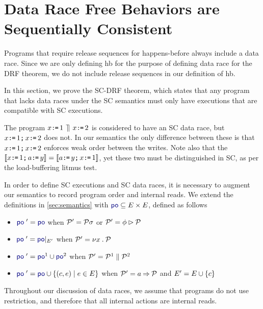 \section{Data Race Free Behaviors are Sequentially Consistent}
\label{sec:sc}


Programs that require release sequences for happens-before always include a
data race.  Since we are only defining hb for the purpose of defining data
race for the DRF theorem, we do not include release sequences in our
definition of hb.

In this section, we prove the SC-DRF theorem, which states that any program
that lacks data races under the SC semantics must only have executions that
are compatible with SC executions.

The program $x\texttt{:}\mkern-1mu\texttt{=}\,1\,\mathbin{\rrceil}\, x\texttt{:}\mkern-1mu\texttt{=}\,2$ is considered to have an SC data race, but
$x\texttt{:}\mkern-1mu\texttt{=}\,1\texttt{;}\, x\texttt{:}\mkern-1mu\texttt{=}\,2$ does not.  In our semantics the only difference
between these is that $x\texttt{:}\mkern-1mu\texttt{=}\,1\texttt{;}\, x\texttt{:}\mkern-1mu\texttt{=}\,2$ enforces weak order between the
writes.  Note also that the
$\llbracket x\texttt{:}\mkern-1mu\texttt{=}\,1\texttt{;}\, a\texttt{:}\mkern-1mu\texttt{=}\, y\rrbracket=\llbracket a\texttt{:}\mkern-1mu\texttt{=}\, y\texttt{;}\, x\texttt{:}\mkern-1mu\texttt{=}\,1\rrbracket$, yet these two must
be distinguished in SC, as per the load-buffering litmus test.

In order to define SC executions and SC data races, it is necessary to
augment our semantics to record program order and internal reads.  We extend the definitions in
\textsection\ref{sec:semantics} with
${\rpox}\subseteq{\Event}\times{\Event}$, defined as follows
\begin{itemize}
\item
  ${\rpox'} = {\rpox}$
  when $\mathcal{P}'=\mathcal{P}\sigma$
  or $\mathcal{P}'=\phi\mathbin\rhd\mathcal{P}$
\item
  ${\rpox'} = {\rpox}\restrict{\Event'}$
  when $\mathcal{P}'=\nu x\mathbin.\mathcal{P}$
\item
  ${\rpox'} = {\rpox}^1\cup{\rpox}^2$
  when $\mathcal{P}'=\mathcal{P}^1\parallel\mathcal{P}^2$
\item
  ${\rpox'} = {\rpox}\cup\{(\cEv,\aEv)\mid\aEv\in\Event\}$
  when $\mathcal{P}'=a\mathbin\Rightarrow\mathcal{P}$ and $E' = E \cup \{c\}$
\end{itemize}
Throughout our discussion of data races, we assume that programs do not use
restriction, and therefore that all internal actions are internal reads.



